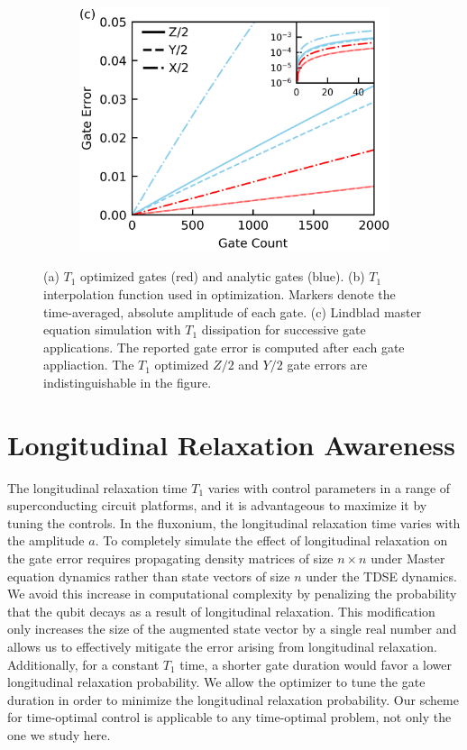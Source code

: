 \documentclass[
  amsfonts,
  amsmath,
  tbtags,
  amssymb,
  aps,
  nobibnotes,
  twocolumn,
  superscriptaddress,
]{revtex4-2}
\begin{document}
\begin{figure}[ht]
\begin{subfigure}{.23\textwidth}
  \end{subfigure}\hfill
  \begin{subfigure}{.4\textwidth}
    \includegraphics[width=\linewidth]{assets/f1c.png}
  \end{subfigure}
  \caption{
    (a) $T_{1}$ optimized gates (red) and analytic gates (blue).
    (b) $T_{1}$ interpolation function used in optimization. Markers
    denote the time-averaged, absolute amplitude of each gate.
    (c) Lindblad master equation simulation with $T_{1}$ dissipation
    for successive gate applications. The reported gate error is computed after
    each gate appliaction. The $T_{1}$ optimized $Z/2$ and $Y/2$ gate errors are indistinguishable
    in the figure.
  }
\end{figure}

\section{Longitudinal Relaxation Awareness}
The longitudinal relaxation time $T_{1}$ varies with
control parameters in a range of superconducting circuit platforms,
and it is advantageous to maximize it by tuning the controls.
In the fluxonium, the longitudinal relaxation time varies with
the amplitude $a$. To completely simulate
the effect of longitudinal relaxation on the gate error requires
propagating density matrices of size $n \times n$ under Master equation
dynamics rather than state vectors of size $n$ under the TDSE dynamics.
We avoid this increase in computational complexity by
penalizing the probability that the qubit decays as a result of
longitudinal relaxation. This modification only
increases the size of the augmented state vector by a single real number
and allows us to effectively mitigate the error arising from longitudinal
relaxation. Additionally, for a constant $T_{1}$ time, a shorter gate duration
would favor a lower longitudinal relaxation probability. We allow
the optimizer to tune the gate duration in order to minimize the
longitudinal relaxation probability. Our scheme for time-optimal
control is applicable to any time-optimal problem, not only
the one we study here.
\end{document}
